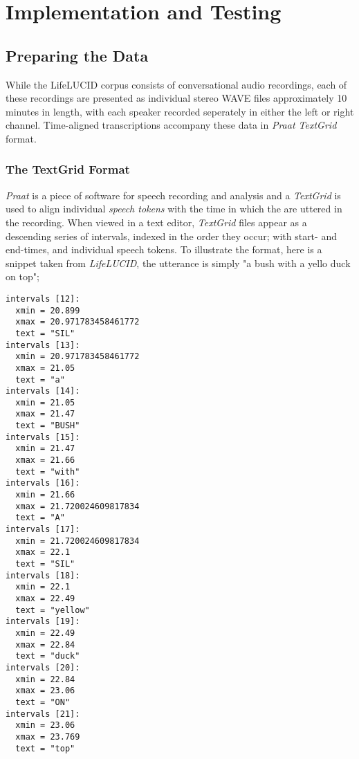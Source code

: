 \chapter{Implementation and Testing}\label{ch:implementation-and-testing}

\section{Preparing the Data}

While the LifeLUCID corpus\cite{lifelucid} consists of conversational audio recordings, each of these recordings are presented as individual stereo WAVE files approximately 10 minutes in length, with each speaker recorded seperately in either the left or right channel.
Time-aligned transcriptions accompany these data in \emph{Praat TextGrid} format.

\subsection{The TextGrid Format}

\emph{Praat} is a piece of software for speech recording and analysis\cite{praat} and a \emph{TextGrid} is used to align individual \emph{speech tokens} with the time in which the are uttered in the recording.
When viewed in a text editor, \emph{TextGrid} files appear as a descending series of intervals, indexed in the order they occur; with start- and end-times, and individual speech tokens.
To illustrate the format, here is a snippet taken from \emph{LifeLUCID}, the utterance is simply "a bush with a yello duck on top";

\begin{verbatim}
intervals [12]:
  xmin = 20.899 
  xmax = 20.971783458461772 
  text = "SIL" 
intervals [13]:
  xmin = 20.971783458461772 
  xmax = 21.05 
  text = "a" 
intervals [14]:
  xmin = 21.05 
  xmax = 21.47 
  text = "BUSH" 
intervals [15]:
  xmin = 21.47 
  xmax = 21.66 
  text = "with" 
intervals [16]:
  xmin = 21.66 
  xmax = 21.720024609817834 
  text = "A" 
intervals [17]:
  xmin = 21.720024609817834 
  xmax = 22.1 
  text = "SIL" 
intervals [18]:
  xmin = 22.1 
  xmax = 22.49 
  text = "yellow" 
intervals [19]:
  xmin = 22.49 
  xmax = 22.84 
  text = "duck" 
intervals [20]:
  xmin = 22.84 
  xmax = 23.06 
  text = "ON" 
intervals [21]:
  xmin = 23.06 
  xmax = 23.769 
  text = "top"
\end{verbatim}

